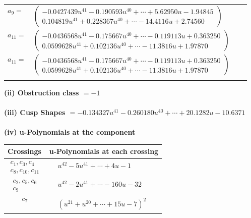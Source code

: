 \documentclass[1p]{elsarticle_modified}
\theoremstyle{definition}
\begin{document}
\begin{tabular}{m{7pt} m{180pt} m{7pt} m{180pt} }
\flushright $a_{9}=$&$\begin{pmatrix}-0.0427439 u^{41}-0.190593 u^{40}+\cdots+5.62950 u-1.94845\\0.104819 u^{41}+0.228367 u^{40}+\cdots-14.4116 u+2.74560\end{pmatrix}$ \\
\flushright $a_{11}=$&$\begin{pmatrix}-0.0436568 u^{41}-0.175667 u^{40}+\cdots-0.119113 u+0.363250\\0.0599628 u^{41}+0.102136 u^{40}+\cdots-11.3816 u+1.97870\end{pmatrix}$\\ \flushright $a_{11}=$&$\begin{pmatrix}-0.0436568 u^{41}-0.175667 u^{40}+\cdots-0.119113 u+0.363250\\0.0599628 u^{41}+0.102136 u^{40}+\cdots-11.3816 u+1.97870\end{pmatrix}$\\&\end{tabular}
\flushleft \textbf{(ii) Obstruction class $= -1$}\\~\\
\flushleft \textbf{(iii) Cusp Shapes $= -0.134327 u^{41}-0.260180 u^{40}+\cdots+20.1282 u-10.6371$}\\~\\
\newpage\renewcommand{\arraystretch}{1}
\flushleft \textbf{(iv) u-Polynomials at the component}\newline \\
\begin{tabular}{m{50pt}|m{274pt}}
Crossings & \hspace{64pt}u-Polynomials at each crossing \\
\hline $$\begin{aligned}c_{1},c_{3},c_{4}\\c_{8},c_{10},c_{11}\end{aligned}$$&$\begin{aligned}
&u^{42}-5 u^{41}+\cdots+4 u-1
\end{aligned}$\\
\hline $$\begin{aligned}c_{2},c_{5},c_{6}\\c_{9}\end{aligned}$$&$\begin{aligned}
&u^{42}-2 u^{41}+\cdots-160 u-32
\end{aligned}$\\
\hline $$\begin{aligned}c_{7}\end{aligned}$$&$\begin{aligned}
&(u^{21}+u^{20}+\cdots+15 u-7)^{2}
\end{aligned}$\\
\hline
\end{tabular}\\~\\
\end{document}
